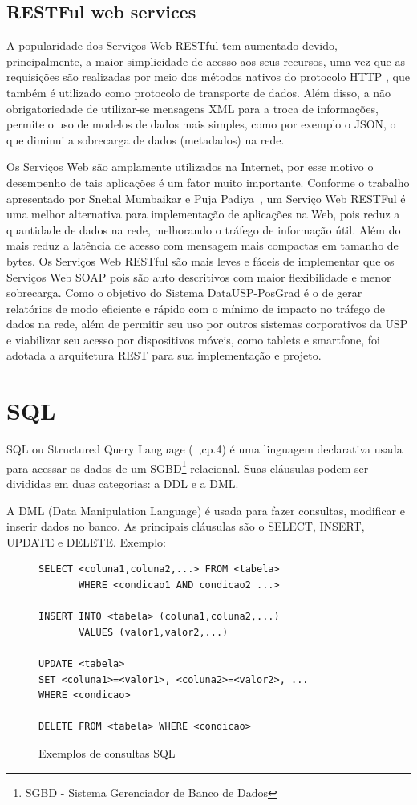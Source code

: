 \subsection{RESTFul web services}
\label{sub:restful}
A popularidade dos Serviços Web RESTful tem aumentado devido, principalmente, a maior simplicidade de acesso aos seus recursos, uma vez que as requisições são realizadas por meio dos métodos nativos do protocolo HTTP , que também é utilizado como protocolo de transporte de dados. Além disso, a não obrigatoriedade de utilizar-se mensagens XML para a troca de informações, permite o uso de modelos de dados mais simples, como por exemplo o JSON, o que diminui a sobrecarga de dados (metadados) na rede.
\par
Os Serviços Web são amplamente utilizados na Internet, por esse motivo o desempenho de tais aplicações é um fator muito importante. Conforme o trabalho apresentado por Snehal Mumbaikar e Puja Padiya~\cite{SMPP}, um Serviço Web RESTFul é uma melhor alternativa para implementação de aplicações na Web, pois reduz a quantidade de dados na rede, melhorando o tráfego de informação útil. Além do mais reduz a latência de acesso com mensagem mais compactas em tamanho de bytes. Os Serviços Web RESTful são mais leves e fáceis de implementar que os Serviços Web SOAP pois são auto descritivos com maior flexibilidade e menor sobrecarga.  Como o objetivo do Sistema DataUSP-PosGrad é o de gerar relatórios de modo eficiente e rápido com o mínimo de impacto no tráfego de dados na rede, além de permitir seu uso por outros sistemas corporativos da USP e viabilizar seu acesso por dispositivos móveis, como tablets e smartfone, foi adotada a arquitetura REST para sua implementação e projeto. 

\section{SQL}
\label{sec:sql}

SQL ou Structured Query Language (~\cite{navat},cp.4) é uma linguagem declarativa usada para acessar os dados de um SGBD\footnote{SGBD - Sistema Gerenciador de Banco de Dados} relacional. Suas cláusulas podem ser divididas em duas categorias: a DDL e a DML.
\par A DML (Data Manipulation Language) é usada para fazer consultas, modificar e inserir dados no banco. As principais cláusulas são o SELECT, INSERT, UPDATE e DELETE. Exemplo:

\begin{figure}[H]
\begin{verbatim}
SELECT <coluna1,coluna2,...> FROM <tabela> 
       WHERE <condicao1 AND condicao2 ...>
       
INSERT INTO <tabela> (coluna1,coluna2,...) 
       VALUES (valor1,valor2,...)     
       
UPDATE <tabela> 
SET <coluna1>=<valor1>, <coluna2>=<valor2>, ... 
WHERE <condicao>

DELETE FROM <tabela> WHERE <condicao>
\end{verbatim}
\caption{Exemplos de consultas SQL}
\label{lst:ia}
\end{figure}

